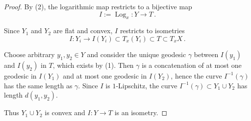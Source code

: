 \documentclass[12pt,leqno]{amsart}
\numberwithin{equation}{section}
\theoremstyle{definition}
\theoremstyle{remark}
\begin{document}
	
	\begin{proof}
		By (2), the logarithmic map restricts to a bijective map
	$$I:=\operatorname{Log}_x :Y\to T\,.$$ 	
		
		
Since $Y_1$ and $Y_2$ are flat and convex, $I$ restricts to isometries
 $$I: Y_i \to I(Y_i)\subset T_x (Y_i)\subset T\subset T_xX\,.$$		 
		
	
		
		Choose arbitrary $y_1,y_2\in Y$ and consider the unique geodesic  $\gamma$ between $I(y_1)$ and $I(y_2)$ in $T$, which exists by (1).  Then $\gamma$ is a concatenation of at most one geodesic in $I(Y_1)$ and at most one geodesic in $I(Y_2)$, hence  the curve $I^{-1}(\gamma)$ has the same length as $\gamma$.  Since $I$ is $1$-Lipschitz, 
		 the curve $I^{-1} (\gamma) \subset Y_1\cup Y_2$  has length $d(y_1,y_2)$.
		 
	 
		 Thus $Y_1\cup Y_2$ is convex and $I:Y\to T$ is an isometry.
	\end{proof}
\end{document}
